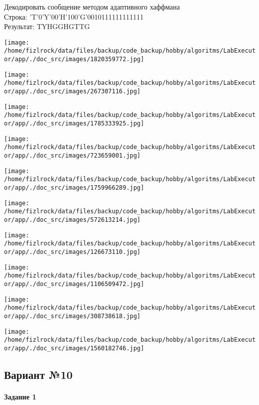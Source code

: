 \documentclass[a4paper, 12pt]{article}
\begin{document}
Декодировать сообщение методом адаптивного хаффмана \\
Строка: 
'T'0'Y'00'H'100'G'0010111111111111\\
Результат: TYHGGHGTTG

\texttt{[image: /home/fizlrock/data/files/backup/code\_backup/hobby/algoritms/LabExecutor/app/./doc\_src/images/1820359772.jpg]}

\texttt{[image: /home/fizlrock/data/files/backup/code\_backup/hobby/algoritms/LabExecutor/app/./doc\_src/images/267307116.jpg]}

\texttt{[image: /home/fizlrock/data/files/backup/code\_backup/hobby/algoritms/LabExecutor/app/./doc\_src/images/1785333925.jpg]}

\texttt{[image: /home/fizlrock/data/files/backup/code\_backup/hobby/algoritms/LabExecutor/app/./doc\_src/images/723659001.jpg]}

\texttt{[image: /home/fizlrock/data/files/backup/code\_backup/hobby/algoritms/LabExecutor/app/./doc\_src/images/1759966289.jpg]}

\texttt{[image: /home/fizlrock/data/files/backup/code\_backup/hobby/algoritms/LabExecutor/app/./doc\_src/images/572613214.jpg]}

\texttt{[image: /home/fizlrock/data/files/backup/code\_backup/hobby/algoritms/LabExecutor/app/./doc\_src/images/126673110.jpg]}

\texttt{[image: /home/fizlrock/data/files/backup/code\_backup/hobby/algoritms/LabExecutor/app/./doc\_src/images/1106509472.jpg]}

\texttt{[image: /home/fizlrock/data/files/backup/code\_backup/hobby/algoritms/LabExecutor/app/./doc\_src/images/308738618.jpg]}

\texttt{[image: /home/fizlrock/data/files/backup/code\_backup/hobby/algoritms/LabExecutor/app/./doc\_src/images/1560182746.jpg]}
\pagebreak
\subsection{Вариант №10}
\paragraph{Задание 1}
\end{document}
